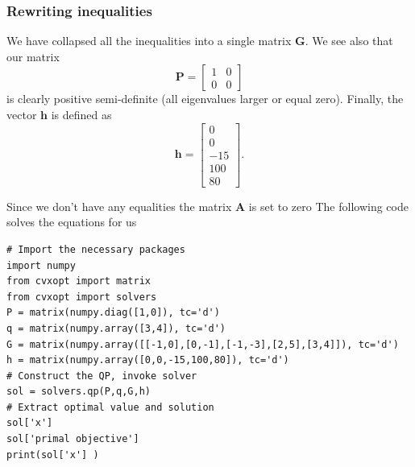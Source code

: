 \documentclass{beamer}
\begin{document}
\begin{frame}
\frametitle{Rewriting inequalities}

We have collapsed all the inequalities into a single matrix $\bm{G}$. We see also that our matrix 
\[
\bm{P} =\begin{bmatrix} 1 & 0\\ 0 & 0  \end{bmatrix}
\]
is clearly positive semi-definite (all eigenvalues larger or equal zero). 
Finally, the vector $\bm{h}$ is defined as 
\[
\bm{h} = \begin{bmatrix}0 \\ 0\\ -15 \\ 100 \\ 80\end{bmatrix}.
\]

Since we don't have any equalities the matrix $\bm{A}$ is set to zero
The following code solves the equations for us















\begin{lstlisting}
# Import the necessary packages
import numpy
from cvxopt import matrix
from cvxopt import solvers
P = matrix(numpy.diag([1,0]), tc='d')
q = matrix(numpy.array([3,4]), tc='d')
G = matrix(numpy.array([[-1,0],[0,-1],[-1,-3],[2,5],[3,4]]), tc='d')
h = matrix(numpy.array([0,0,-15,100,80]), tc='d')
# Construct the QP, invoke solver
sol = solvers.qp(P,q,G,h)
# Extract optimal value and solution
sol['x'] 
sol['primal objective']
print(sol['x'] )

\end{lstlisting}
\end{frame}
\end{document}
